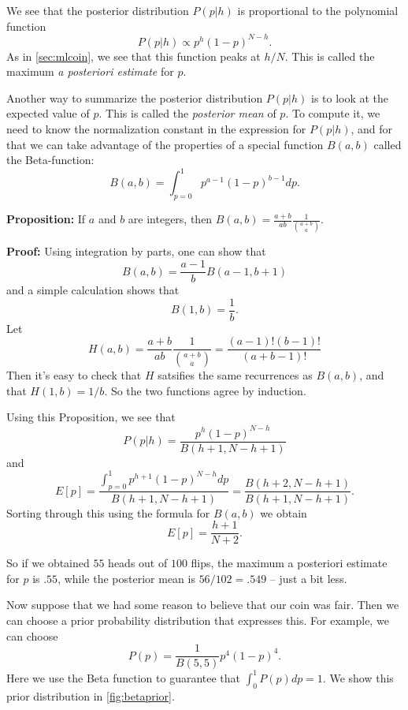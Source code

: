 \documentclass[
]{article}
\begin{document}
We see that the posterior distribution \(P(p|h)\) is proportional to the
polynomial function \[
P(p|h)\propto p^{h}(1-p)^{N-h}.
\] As in \cref{sec:mlcoin}, we see that this function peaks at \(h/N\).
This is called the maximum \emph{a posteriori estimate} for \(p\).

Another way to summarize the posterior distribution \(P(p|h)\) is to
look at the expected value of \(p\). This is called the \emph{posterior
mean} of \(p\). To compute it, we need to know the normalization
constant in the expression for \(P(p|h)\), and for that we can take
advantage of the properties of a special function \(B(a,b)\) called the
Beta-function: \[
B(a,b) = \int_{p=0}^{1} p^{a-1}(1-p)^{b-1} dp.
\]

\textbf{Proposition:} If \(a\) and \(b\) are integers, then
\(B(a,b)=\frac{a+b}{ab}\frac{1}{\binom{a+b}{a}}\).

\textbf{Proof:} Using integration by parts, one can show that \[
B(a,b)=\frac{a-1}{b}B(a-1,b+1)
\] and a simple calculation shows that \[
B(1,b) = \frac{1}{b}.
\] Let \[
H(a,b)=\frac{a+b}{ab}\frac{1}{\binom{a+b}{a}} = \frac{(a-1)!(b-1)!}{(a+b-1)!}
\] Then it's easy to check that \(H\) satsifies the same recurrences as
\(B(a,b)\), and that \(H(1,b)=1/b\). So the two functions agree by
induction.

Using this Proposition, we see that \[
P(p|h) = \frac{p^{h}(1-p)^{N-h}}{B(h+1,N-h+1)}
\] and \[
E[p] = \frac{\int_{p=0}^{1} p^{h+1}(1-p)^{N-h}dp}{B(h+1,N-h+1)}=\frac{B(h+2,N-h+1)}{B(h+1,N-h+1)}.
\] Sorting through this using the formula for \(B(a,b)\) we obtain \[
E[p]=\frac{h+1}{N+2}.
\]

So if we obtained \(55\) heads out of \(100\) flips, the maximum a
posteriori estimate for \(p\) is \(.55\), while the posterior mean is
\(56/102=.549\) -- just a bit less.

Now suppose that we had some reason to believe that our coin was fair.
Then we can choose a prior probability distribution that expresses this.
For example, we can choose \[
P(p) = \frac{1}{B(5,5)}p^{4}(1-p)^{4}.
\] Here we use the Beta function to guarantee that
\(\int_{0}^{1}P(p)dp=1\). We show this prior distribution in
\cref{fig:betaprior}.
\end{document}
